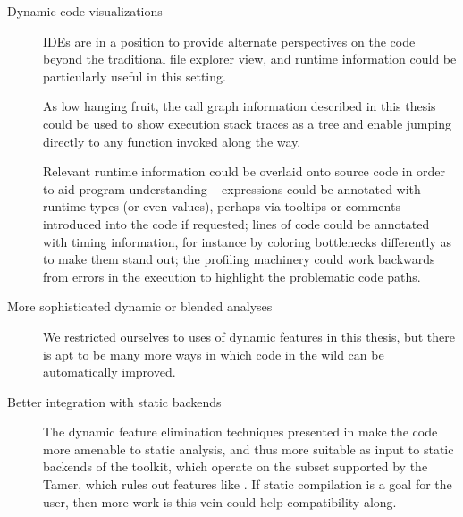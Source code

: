 \begin{description}

\item[Dynamic code visualizations] IDEs are in a position to provide alternate
perspectives on the code beyond the traditional file explorer view, and runtime
information could be particularly useful in this setting.

As low hanging fruit, the call graph information described in this thesis could
be used to show execution stack traces as a tree and enable jumping directly to
any function invoked along the way.

Relevant runtime information could be overlaid onto source code in order to aid
program understanding -- expressions could be annotated with runtime types (or
even values), perhaps via tooltips or comments introduced into the code if
requested; lines of code could be annotated with timing information, for
instance by coloring bottlenecks differently as to make them stand out; the
profiling machinery could work backwards from errors in the execution to
highlight the problematic code paths.

\item[More sophisticated dynamic or blended analyses] We restricted ourselves
to uses of dynamic features in this thesis, but there is apt to be many more
ways in which \matlab code in the wild can be automatically improved.

\item[Better integration with \mclab static backends] The dynamic feature
elimination techniques presented in 
make the code more amenable to static analysis, and thus more suitable as input
to static backends of the \mclab toolkit, which operate on the \matlab subset
supported by the \matlab Tamer, which rules out features like . If
static compilation is a goal for the user, then more work is this vein could
help compatibility along.

\end{description}
